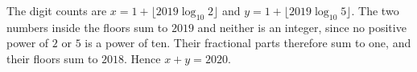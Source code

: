 The digit counts are $x=1+\lfloor2019\log_{10}2\rfloor$ and $y=1+\lfloor2019\log_{10}5\rfloor$. The two numbers inside the floors sum to $2019$ and neither is an integer, since no positive power of $2$ or $5$ is a power of ten. Their fractional parts therefore sum to one, and their floors sum to $2018$. Hence $\boxed{x+y=2020}$.

